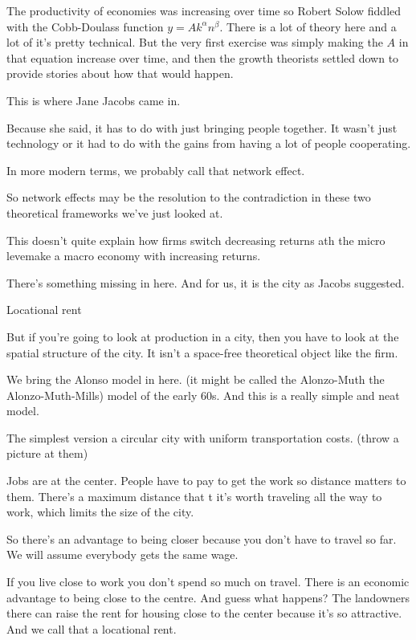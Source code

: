 The productivity of economies was increasing over time so Robert Solow fiddled with the Cobb-Doulass function $y=Ak^\alpha n^\beta$. There is a lot of theory here and a lot of it's pretty technical. But the very first exercise was simply making the $A$ in that equation increase over time, and then the growth theorists settled down to provide stories about how that would happen. 

This is where Jane Jacobs came in.

Because she said, it has to do with just bringing people together. It wasn't just technology or it had to do with the gains from having a lot of people cooperating.

In more modern terms, we probably call that network effect.

So network effects may be the resolution to the contradiction in these two theoretical frameworks we've just looked at.

This doesn't quite explain how  firms switch decreasing returns ath the micro levemake a  macro economy with increasing returns. 

There's something missing in here. And for us, it is the city as Jacobs suggested.

Locational rent 

But if you're going to look at production in a city, then you have to look at the spatial structure of the city. It isn't a space-free theoretical object like the firm.


We bring the Alonso model in here. (it might be called the Alonzo-Muth the Alonzo-Muth-Mills) model of the early 60s. And this is a really simple and neat model. 

The simplest version a  circular city with uniform transportation costs.  (throw a picture at them) 

Jobs are at the center. People have to pay to get the work so distance matters to them.
There's a maximum distance that t it's worth traveling all the way to work, which limits the size of the city.

So there's an advantage to being closer because you don't have to travel so far. 
We will assume everybody gets the same wage.

If you live close to work you don't spend so much on travel.  There is an economic advantage to being close to the centre. And guess what happens? The landowners there can raise the rent for housing close to the center because it's so attractive. And we call that a locational rent.

